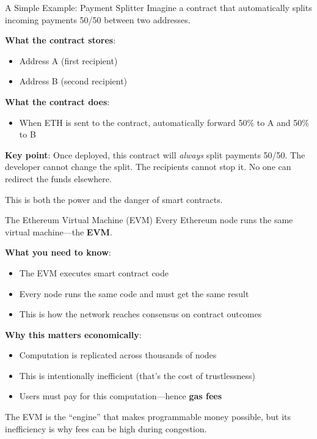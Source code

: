 \documentclass[10pt]{beamer}
\newcommand{\highlight}[1]{\textcolor{AccentOrange}{\textbf{#1}}}
\begin{document}
\begin{frame}{A Simple Example: Payment Splitter}
  Imagine a contract that automatically splits incoming payments 50/50 between two addresses.
  
  \vspace{1em}
  \textbf{What the contract stores}:
  \begin{itemize}
    \item Address A (first recipient)
    \item Address B (second recipient)
  \end{itemize}
  
  \vspace{0.5em}
  \textbf{What the contract does}:
  \begin{itemize}
    \item When ETH is sent to the contract, automatically forward 50\% to A and 50\% to B
  \end{itemize}
  
  \vspace{1em}
  \textbf{Key point}: Once deployed, this contract will \textit{always} split payments 50/50. The developer cannot change the split. The recipients cannot stop it. No one can redirect the funds elsewhere.
  
  \vspace{0.5em}
  This is both the power and the danger of smart contracts.
\end{frame}

\begin{frame}{The Ethereum Virtual Machine (EVM)}
  Every Ethereum node runs the same virtual machine---the \highlight{EVM}.
  
  \vspace{1em}
  \textbf{What you need to know}:
  \begin{itemize}
    \item The EVM executes smart contract code
    \item Every node runs the same code and must get the same result
    \item This is how the network reaches consensus on contract outcomes
  \end{itemize}
  
  \vspace{1em}
  \textbf{Why this matters economically}:
  \begin{itemize}
    \item Computation is replicated across thousands of nodes
    \item This is intentionally inefficient (that's the cost of trustlessness)
    \item Users must pay for this computation---hence \highlight{gas fees}
  \end{itemize}
  
  \vspace{1em}
  The EVM is the ``engine'' that makes programmable money possible, but its inefficiency is why fees can be high during congestion.
\end{frame}
\end{document}
